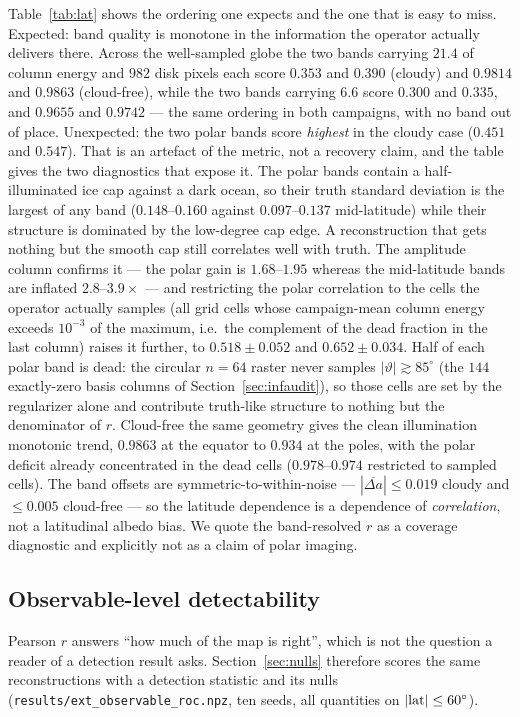 \documentclass[twocolumn,10pt]{article}
\begin{document}
Table~\ref{tab:lat} shows the ordering one expects and the one that is easy
to miss. Expected: band quality is monotone in the information the operator
actually delivers there. Across the well-sampled globe the two bands carrying
$21.4$ of column energy and $982$ disk pixels each score $0.353$ and $0.390$
(cloudy) and $0.9814$ and $0.9863$ (cloud-free), while the two bands carrying
$6.6$ score $0.300$ and $0.335$, and $0.9655$ and $0.9742$ --- the same ordering
in both campaigns, with no band out of place. Unexpected: the two polar bands score
\emph{highest} in the cloudy case ($0.451$ and $0.547$). That is an artefact of
the metric, not a recovery claim, and the table gives the two diagnostics that
expose it. The polar bands contain a half-illuminated ice cap against a dark
ocean, so their truth standard deviation is the largest of any band
($0.148$--$0.160$ against $0.097$--$0.137$ mid-latitude) while their structure is
dominated by the low-degree cap edge. A reconstruction that
gets nothing but the smooth cap still correlates well with truth. The amplitude
column confirms it --- the polar gain is $1.68$--$1.95$ whereas the
mid-latitude bands are inflated $2.8$--$3.9\times$ --- and restricting the polar
correlation to the cells the operator actually samples (all grid cells whose
campaign-mean column energy exceeds $10^{-3}$ of the maximum, i.e.\ the
complement of the dead fraction in the last column) raises it further, to
$0.518\pm0.052$ and $0.652\pm0.034$. Half of each polar band is dead: the circular $n=64$
raster never samples $|\vartheta|\gtrsim85^{\circ}$ (the
$144$ exactly-zero basis columns of Section~\ref{sec:infaudit}), so those cells
are set by the regularizer alone and contribute truth-like structure to nothing
but the denominator of $r$. Cloud-free the same geometry gives the clean
illumination monotonic trend, $0.9863$ at the equator to $0.934$ at the poles,
with the polar deficit already concentrated in the dead cells
($0.978$--$0.974$ restricted to sampled cells). The band offsets are
symmetric-to-within-noise --- $|\overline{\Delta a}| \le 0.019$ cloudy and
$\le0.005$ cloud-free --- so the latitude dependence is a dependence of
\emph{correlation}, not a latitudinal albedo bias. We quote the band-resolved
$r$ as a coverage diagnostic and explicitly not as a claim of polar imaging.
\subsection{Observable-level detectability}
\label{sec:roc}
Pearson $r$ answers ``how much of the map is right'', which is not the question a
reader of a detection result asks. Section~\ref{sec:nulls} therefore scores the
same reconstructions with a detection statistic and its nulls
({\tt results/ext\_observable\_roc.npz}, ten seeds, all quantities on
$|{\rm lat}|\le60^\circ$).
\end{document}
